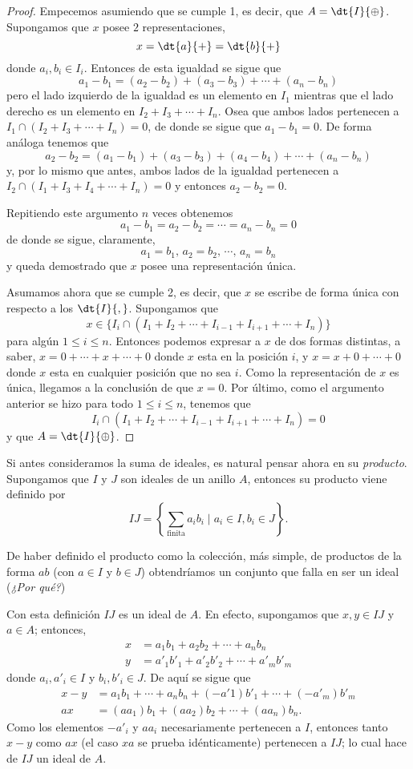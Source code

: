 \begin{proof}
	Empecemos asumiendo que se cumple 1, es decir, que $A = \dt{I}{\oplus}$. Supongamos que $x$ posee $2$ representaciones,
	\[ x = \dt{a}{+} = \dt{b}{+} \]
	donde $a_i,b_i\in I_i$. Entonces de esta igualdad se sigue que
	\[ a_1 - b_1 = (a_2-b_2) + (a_3 - b_3) + \cdots + (a_n - b_n) \]
	pero el lado izquierdo de la igualdad es un elemento en $I_1$ mientras que el lado derecho es un elemento en $I_2+I_3+\cdots+I_n$. Osea que ambos lados pertenecen a $I_1 \cap (I_2+I_3+\cdots+I_n) = 0$, de donde se sigue que $a_1-b_1 = 0$. De forma análoga tenemos que 
	\[ a_2 - b_2 = (a_1-b_1) + (a_3 - b_3) + (a_4-b_4) +\cdots + (a_n-b_n) \]
	y, por lo mismo que antes, ambos lados de la igualdad pertenecen a $I_2 \cap (I_1+I_3+I_4+\cdots+I_n)=0$ y entonces $a_2-b_2 = 0$.
	
	Repitiendo este argumento $n$ veces obtenemos 
	\[ a_1-b_1 = a_2-b_2 = \cdots = a_n-b_n = 0 \]
	de donde se sigue, claramente, 
	\[ a_1 = b_1,\, a_2=b_2,\, \cdots,\, a_n=b_n \]
	y queda demostrado que $x$ posee una representación única.
	
	Asumamos ahora que se cumple 2, es decir, que $x$ se escribe de forma única con respecto a los $\dt{I}{,}$. Supongamos que \[x\in \{I_i \cap (I_1+I_2+\cdots+I_{i-1}+I_{i+1}+\cdots+I_n)\}\] para algún $1 \leq i \leq n$. Entonces podemos expresar a $x$ de dos formas distintas, a saber, $x = 0+\cdots+x+\cdots+0$ donde $x$ esta en la posición $i$, y $x = x + 0 +\cdots + 0$ donde $x$ esta en cualquier posición que no sea $i$. Como la representación de $x$ es única, llegamos a la conclusión de que $x = 0$. Por último, como el argumento anterior se hizo para todo $1 \leq i \leq n$, tenemos que \[I_i \cap (I_1+I_2+\cdots+I_{i-1}+I_{i+1}+\cdots+I_n) = 0\] y que $A = \dt{I}{\oplus}$.
\end{proof}
%
Si antes consideramos la suma de ideales, es natural pensar ahora en su \textit{producto}. Supongamos que $I$ y $J$ son ideales de un anillo $A$, entonces su producto viene definido por 
\[ IJ = \left\{\sum_{\text{finita}} a_ib_i \mid a_i\in I, b_i\in J \right\}. \] 
\begin{nota}
	De haber definido el producto como la colección, más simple, de productos de la forma $ab$ (con $a\in I$ y $b\in J$) obtendríamos un conjunto que falla en ser un ideal (\textit{¿Por qué?})
\end{nota}
Con esta definición $IJ$ es un ideal de $A$. En efecto, supongamos que $x,y \in IJ$ y $a\in A$; entonces,
\begin{align*}
x &= a_1b_1+a_2b_2+\cdots+a_nb_n \\
y &= a'_1b'_1+a'_2b'_2+\cdots+a'_mb'_m
\end{align*}
donde $a_i,a'_i\in I$ y $b_i,b'_i\in J$. De aquí se sigue que
\begin{align*}
x-y &= a_1b_1+\cdots+a_nb_n+(-a'1)b'_1+\cdots+(-a'_m)b'_m \\
ax &= (aa_1)b_1+(aa_2)b_2+\cdots+(aa_n)b_n.
\end{align*}
Como los elementos $-a'_i$ y $aa_i$ necesariamente pertenecen a $I$, entonces tanto $x-y$ como $ax$ (el caso $xa$ se prueba idénticamente) pertenecen a $IJ$; lo cual hace de $IJ$ un ideal de $A$.

